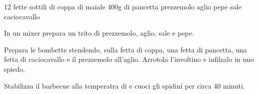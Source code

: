 \vegetarian
\freeze
\begin{ingreds}
	12 fette sottili di coppa di maiale
	400g di pancetta
	prezzemolo
	aglio
	pepe
	sale
	caciocavallo

\end{ingreds}

\begin{method}
	In un mixer prepara un trito di prezzemolo, aglio, sale e pepe.

	Prepara le bombette stendendo, sulla fetta di coppa, una fetta di pancetta, una fetta di caciocavallo e il prezzemolo all'aglio. Arrotola l'involtino e infilzalo in uno spiedo.

	Stabilizza il barbecue alla temperatra di  e cuoci gli spidini per circa 40 minuti.
\end {method}
